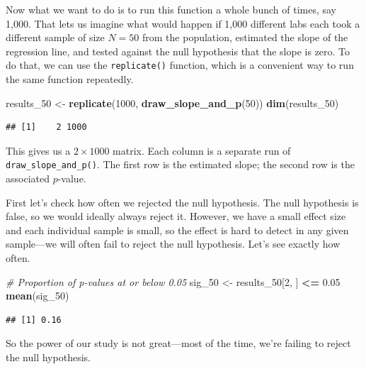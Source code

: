 \documentclass[12pt,oneside,openany]{book}
\newenvironment{Shaded}{\begin{snugshade}}{\end{snugshade}}
\newcommand{\KeywordTok}[1]{\textcolor[rgb]{0.13,0.29,0.53}{\textbf{#1}}}
\newcommand{\DecValTok}[1]{\textcolor[rgb]{0.00,0.00,0.81}{#1}}
\newcommand{\FloatTok}[1]{\textcolor[rgb]{0.00,0.00,0.81}{#1}}
\newcommand{\StringTok}[1]{\textcolor[rgb]{0.31,0.60,0.02}{#1}}
\newcommand{\CommentTok}[1]{\textcolor[rgb]{0.56,0.35,0.01}{\textit{#1}}}
\newcommand{\OperatorTok}[1]{\textcolor[rgb]{0.81,0.36,0.00}{\textbf{#1}}}
\newcommand{\NormalTok}[1]{#1}
\begin{document}
Now what we want to do is to run this function a whole bunch of times,
say 1,000. That lets us imagine what would happen if 1,000 different
labs each took a different sample of size \(N = 50\) from the
population, estimated the slope of the regression line, and tested
against the null hypothesis that the slope is zero. To do that, we can
use the \texttt{replicate()} function, which is a convenient way to run
the same function repeatedly.

\begin{Shaded}
\begin{Highlighting}[]
\NormalTok{results_}\DecValTok{50}\NormalTok{ <-}\StringTok{ }\KeywordTok{replicate}\NormalTok{(}\DecValTok{1000}\NormalTok{, }\KeywordTok{draw_slope_and_p}\NormalTok{(}\DecValTok{50}\NormalTok{))}
\KeywordTok{dim}\NormalTok{(results_}\DecValTok{50}\NormalTok{)}
\end{Highlighting}
\end{Shaded}

\begin{verbatim}
## [1]    2 1000
\end{verbatim}

This gives us a \(2 \times 1000\) matrix. Each column is a separate run
of \texttt{draw\_slope\_and\_p()}. The first row is the estimated slope;
the second row is the associated \(p\)-value.

First let's check how often we rejected the null hypothesis. The null
hypothesis is false, so we would ideally always reject it. However, we
have a small effect size and each individual sample is small, so the
effect is hard to detect in any given sample---we will often fail to
reject the null hypothesis. Let's see exactly how often.

\begin{Shaded}
\begin{Highlighting}[]
\CommentTok{# Proportion of p-values at or below 0.05}
\NormalTok{sig_}\DecValTok{50}\NormalTok{ <-}\StringTok{ }\NormalTok{results_}\DecValTok{50}\NormalTok{[}\DecValTok{2}\NormalTok{, ] }\OperatorTok{<=}\StringTok{ }\FloatTok{0.05}
\KeywordTok{mean}\NormalTok{(sig_}\DecValTok{50}\NormalTok{)}
\end{Highlighting}
\end{Shaded}

\begin{verbatim}
## [1] 0.16
\end{verbatim}

So the power of our study is not great---most of the time, we're failing
to reject the null hypothesis.
\end{document}
